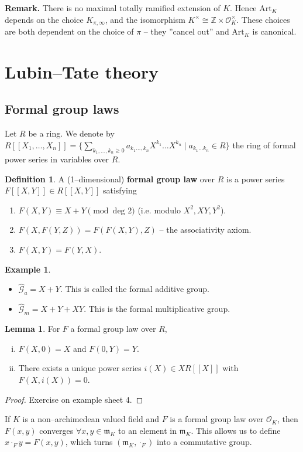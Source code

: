 \documentclass{article}
\theoremstyle{definition}
\newtheorem{lemma}[theorem]{Lemma}
\newtheorem{example}{Example}[section]
\newtheorem{defn}{Definition}[section]
\begin{document}
\textbf{Remark.} There is no maximal totally ramified extension of $K$. Hence $\text{Art}_K$ depends on the choice $K_{\pi, \infty}$, and the isomorphism $K^{\times} \cong \mathbb{Z} \times \mathcal{O}_K^\times$. These choices are both dependent on the choice of $\pi$ -- they ''cancel out'' and $\text{Art}_K$ is canonical.

\section{Lubin--Tate theory}
\subsection{Formal group laws}
Let $R$ be a ring. We denote by $R[[X_1,\ldots,X_n]] = \{\sum_{k_1,\ldots,k_n\ge 0}^{} a_{k_1\ldots,k_n}X^{k_1}\ldots X^{k_n} \mid a_{k_1\ldots k_n} \in R\}$ the ring of formal power series in variables over $R$.
\begin{defn}
    A (1--dimensional) \textbf{formal group law} over $R$ is a power series $F[[X,Y]] \in R[[X,Y]]$ satisfying
    \begin{enumerate}
        \item $F(X,Y) \equiv X + Y \pmod{\text{deg }2}$ (i.e. modulo $X^2,XY,Y^2$).
        \item $F(X,F(Y,Z)) = F(F(X,Y), Z)$ -- the associativity axiom.
        \item $F(X,Y) = F(Y,X)$.
    \end{enumerate}
\end{defn}
\begin{example}
    \begin{itemize}
        \item $\hat{\mathcal{G}}_a = X + Y$. This is called the formal additive group.
        \item $\hat{\mathcal{G}}_m = X + Y + XY$. This is the formal multiplicative group.
    \end{itemize}
\end{example}
\begin{lemma}
    For $F$ a formal group law over $R$,
    \begin{enumerate}[(i)]
        \item $F(X,0) = X$ and $F(0,Y) = Y$.
        \item There exists a unique power series $i(X) \in X R[[X]]$ with   $F(X,i(X))=0$.
    \end{enumerate}
\end{lemma}
\begin{proof}
    Exercise on example sheet 4.
\end{proof}
If $K$ is a non--archimedean valued field and $F$ is a formal group law over $\mathcal{O}_K$, then $F(x,y)$ converges $\forall x,y \in \mathfrak{m}_K$ to an element in $\mathfrak{m}_K$. This allows us to define $x \cdot_F y = F(x,y)$, which turns $(\mathfrak{m}_K, \cdot_F)$ into a commutative group.
\end{document}
